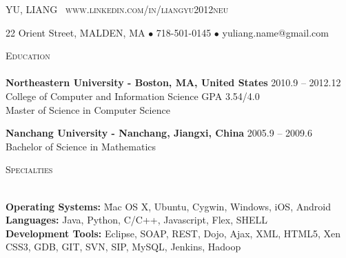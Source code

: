 \documentclass{article}
\newcommand{\lineunder}{\vspace*{-8pt} \\ \hspace*{-18pt} \hrulefill \\}
\newcommand{\header}[1]{{\hspace*{-15pt}\vspace*{6pt}  \textsc{#1}} \vspace*{-6pt} \lineunder}
\newcommand{\nanchang}[5]{
 \textbf{#1 #2} \hfill #3 \\ #4 \\ #5}
\begin{document}
\large{

\smallskip
\vspace*{-45pt}


\vspace*{-10pt}
\begin{center}
{\LARGE \scshape {YU, LIANG} \ \small{www.linkedin.com/in/liangyu2012neu} }
\end{center}
\vspace*{-15pt}

\hspace*{-18pt} \hrulefill

\vspace*{-8pt}

\begin{center}
\small {22 Orient Street, MALDEN, MA $\bullet$ 718-501-0145 $\bullet$ yuliang.name@gmail.com}
\end{center}

\vspace*{-10pt}


\header{Education}
\nanchang{Northeastern University}{- Boston, MA, United States}{2010.9 -- 2012.12}
{College of Computer and Information Science \hfill{GPA 3.54/4.0}}
{Master of Science in Computer Science}

\vspace*{5pt}

\nanchang{Nanchang University}{- Nanchang, Jiangxi, China} {2005.9 -- 2009.6}
{Bachelor of Science in Mathematics \hfill{}}

\vspace*{5pt}
       
\header{Specialties}

\vspace*{-5pt}
\begin{tabbing}
  \hspace{0.1cm}\= \textbf{Operating Systems:} \quad\= Mac OS X, Ubuntu, Cygwin, Windows, iOS, Android\\
              \> \textbf{Languages:}              \> Java, Python, C/C++, Javascript, Flex, SHELL\\
              \> \textbf{Development Tools:}      \> Eclipse, SOAP, REST, Dojo, Ajax, XML, HTML5, Xen\\
              \>                                  \> CSS3, GDB, GIT, SVN, SIP, MySQL, Jenkins, Hadoop

\end{tabbing}


\vspace*{-10pt}


}
\end{document}
